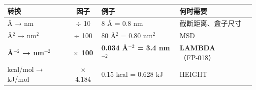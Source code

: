 \documentclass[11pt,a4paper]{article}
\begin{document}
\begin{center}
\begin{tabular}{@{}lcll@{}}
\toprule
\textbf{转换} & \textbf{因子} & \textbf{例子} & \textbf{何时需要} \\
\midrule
\AA{} → nm & $\div$ 10 & 8 \AA{} = 0.8 nm & 截断距离、盒子尺寸 \\
\AA$^2$ → nm$^2$ & $\div$ 100 & 80 \AA$^2$ = 0.80 nm$^2$ & MSD \\
\textbf{\AA$^{-2}$ → nm$^{-2}$} & \textbf{$\times$ 100} & \textbf{0.034 \AA$^{-2}$ = 3.4 nm$^{-2}$} & \textbf{LAMBDA}（FP-018） \\
kcal/mol → kJ/mol & $\times$ 4.184 & 0.15 kcal = 0.628 kJ & HEIGHT \\
\bottomrule
\end{tabular}
\end{center}
\end{document}
